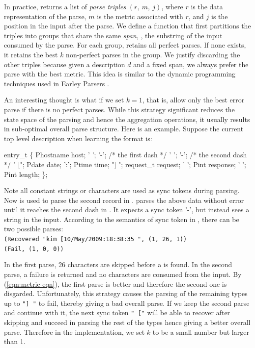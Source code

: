 In practice,  returns a list of
{\em parse triples} $(r,~m,~j)$, where $r$ is the data representation of
the parse, $m$ is the metric associated with $r$, and
$j$ is the position in the input after the parse.
We define a  function that first partitions the
triples into groups that share the same 
{\em span}, \ie{}, the substring of the input consumed by the parse.
For each group,  retains all perfect parses. If 
none exists, it retains the best $k$ non-perfect parses in the group. 
We justify discarding the other triples because
given a description $d$ and a fixed span, we always
prefer the parse with the best metric. This idea is
similar to the dynamic programming techniques used in 
Earley Parsers \cite{earley-parser}. 

An interesting thought is what if
we set $k=1$, that is, allow only the best error parse if there is
no perfect parses. While this strategy significant reduces the
state space of the parsing and hence the aggregation operations,
it usually results in sub-optimal overall parse structure. Here is an
example. Suppose the current top level description  when learning 
the \ai{} format is:
\begin{code}
  entry_t \{
         Phostname      host;
   ' ';  
   '-';  /* the first dash */
   ' ';  
   '-';	 /* the second dash */   
   " ["; Pdate          date;
   ':';  Ptime          time;
   "] "; request_t      request;
   ' ';  Pint           response;
   ' ';  Pint           length;
\};
\end{code}
Note all constant strings or characters are used as sync tokens during
parsing. Now  is used to parse the second record in .
 parses the above data without error until it
reaches the second dash in . It expects a sync token
'-', but instead sees a string  in the input.
According to the semantics of sync token in ,
there can be two possible parses:\\
{\footnotesize
\verb#(Recovered "kim [10/May/2009:18:38:35 ", (1, 26, 1))#\\
\verb#(Fail, (1, 0, 0))#
}

In the first parse, 26 characters are skipped before a \cd{-} is found.
In the second parse, a failure is returned and no characters are consumed
from the input.
By (\ref{eqn:metric-eqn}), the first parse is better and therefore the
second one is disgarded. Unfortunately, this strategy causes the parsing of the
remaining types up to \verb#"] "# to fail, thereby giving a bad overall parse.
If we keep the second parse and continue with it, the next sync token 
\verb#" ["# will be able to recover after skipping  and succeed
in parsing the rest of the types hence giving a better overall parse.
Therefore in the implementation, we set $k$ to be a small number but larger
than 1.

